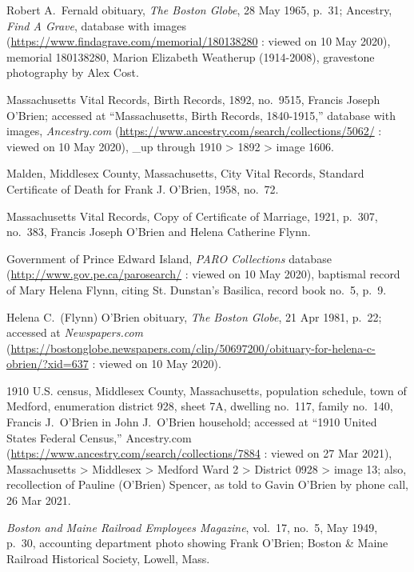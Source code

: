 \begin{thebibliography}{999}
Robert A.\ Fernald obituary, \textit{The Boston Globe}, 28 May 1965, p.\ 31; Ancestry, \textit{Find A Grave}, database with images (\url{https://www.findagrave.com/memorial/180138280} : viewed on 10 May 2020), memorial 180138280, Marion Elizabeth Weatherup (1914-2008), gravestone photography by Alex Cost.


Massachusetts Vital Records, Birth Records, 1892, no.\ 9515, Francis Joseph O'Brien; accessed at ``Massachusetts, Birth Records, 1840-1915,'' database with images, \textit{Ancestry.com} (\url{https://www.ancestry.com/search/collections/5062/} : viewed on 10 May 2020), \_up through 1910 > 1892 > image 1606.

Malden, Middlesex County, Massachusetts, City Vital Records, Standard Certificate of Death for Frank J. O'Brien, 1958, no.\ 72.

Massachusetts Vital Records, Copy of Certificate of Marriage, 1921, p.\ 307, no.\ 383, Francis Joseph O'Brien and Helena Catherine Flynn.

Government of Prince Edward Island, \textit{PARO Collections} database (\url{http://www.gov.pe.ca/parosearch/} : viewed on 10 May 2020), baptismal record of Mary Helena Flynn, citing St. Dunstan's Basilica, record book no.\ 5, p.\ 9.

Helena C.\ (Flynn) O'Brien obituary, \textit{The Boston Globe}, 21 Apr 1981, p.\ 22; accessed at \textit{Newspapers.com} (\url{https://bostonglobe.newspapers.com/clip/50697200/obituary-for-helena-c-obrien/?xid=637} : viewed on 10 May 2020).

1910 U.S. census, Middlesex County, Massachusetts, population schedule, town of Medford, enumeration district 928, sheet 7A, dwelling no.\ 117, family no.\ 140, Francis J.\ O'Brien in John J.\ O'Brien household; accessed at  ``1910 United States Federal Census,'' Ancestry.com (\url{https://www.ancestry.com/search/collections/7884} : viewed on 27 Mar 2021), Massachusetts > Middlesex > Medford Ward 2 > District 0928 > image 13; also, recollection of Pauline (O'Brien) Spencer, as told to Gavin O'Brien by phone call, 26 Mar 2021.

\textit{Boston and Maine Railroad Employees Magazine}, vol.\ 17, no.\ 5, May 1949, p.\ 30, accounting department photo showing Frank O'Brien; Boston \& Maine Railroad Historical Society, Lowell, Mass.


\end{thebibliography}
